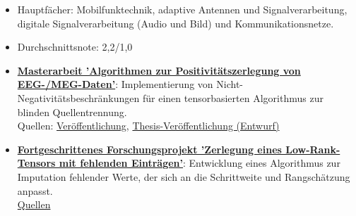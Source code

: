 \vspace{-0.5em}
\begin{itemize}[leftmargin=*]
  \item Hauptfächer: Mobilfunktechnik, adaptive Antennen und Signalverarbeitung, digitale Signalverarbeitung (Audio und Bild) und Kommunikationsnetze.
  \item Durchschnittsnote: 2,2/1,0

\vspace{0.2em}

  \item \underline{\textbf{Masterarbeit 'Algorithmen zur Positivitätszerlegung von EEG-/MEG-Daten'}}: Implementierung von Nicht-Negativitätsbeschränkungen für einen tensorbasierten Algorithmus zur blinden Quellentrennung.
  \\ {\fontsize{10pt}{10pt}\selectfont\textcolor{blocktext2_color}{Quellen: {\fontsize{10pt}{10pt}\selectfont\textcolor{blocktext2_color}{\href{https://ieeexplore.ieee.org/document/8313193}{Veröffentlichung}}, {\fontsize{10pt}{10pt}\selectfont\textcolor{blocktext2_color}{\href{https://amr-aboughazala.super.site/non-negative-semi-algebraic-cp-decomposition-via-simultaneous-matrix-diagonalization}{Thesis-Veröffentlichung (Entwurf)}}}}}}

\vspace{0.2em}  

  \item \underline{\textbf{Fortgeschrittenes Forschungsprojekt 'Zerlegung eines Low-Rank-Tensors mit fehlenden Einträgen'}}: Entwicklung eines Algorithmus zur Imputation fehlender Werte, der sich an die Schrittweite und Rangschätzung anpasst.
  \\ {\fontsize{10pt}{10pt}\selectfont\textcolor{blocktext2_color}{\href{https://amr-aboughazala.super.site/decomposition-of-a-low-rank-tensor-with-missing-entries}{Quellen}}}       
\end{itemize}                          

                                
                                 
